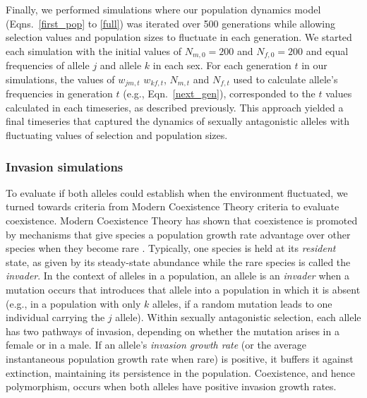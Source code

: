 \documentclass[12pt]{article}
\begin{document}


Finally, we performed simulations where our population dynamics model (Eqns.~\ref{first_pop} to \ref{full}) was iterated over 500 generations while allowing selection values and population sizes to fluctuate in each generation. We started each simulation with the initial values of $N_{m,0}=200$ and $N_{f,0}=200$ and equal frequencies of allele $j$ and allele $k$ in each sex. For each generation $t$ in our simulations, the values of $w_{jm,t}$ $w_{kf,t}$, $N_{m,t}$ and $N_{f,t}$ used to calculate allele's frequencies in generation $t$ (e.g., Eqn.~\ref{next_gen}), corresponded to the $t$ values calculated in each timeseries, as described previously. This approach yielded a final timeseries that captured the dynamics of sexually antagonistic alleles with fluctuating values of selection and population sizes.

\subsubsection*{Invasion simulations}

 To evaluate if both alleles could establish when the environment fluctuated, we turned towards criteria from Modern Coexistence Theory criteria to evaluate coexistence. Modern Coexistence Theory has shown that coexistence is promoted by mechanisms that give species a population growth rate advantage over other species when they become rare \citep{chesson_stabilizing_1982, chesson2003quantifying, barabas_chessons_2018}. Typically, one species is held at its \textit{resident} state, as given by its steady-state abundance while the rare species is called the \textit{invader}. In the context of alleles in a population, an allele is an \textit{invader} when a mutation occurs that introduces that allele into a population in which it is absent (e.g., in a population with only $k$ alleles, if a random mutation leads to one individual carrying the $j$ allele). Within sexually antagonistic selection, each allele has two pathways of invasion, depending on whether the mutation arises in a female or in a male. If an allele's \textit{invasion growth rate} (or the average instantaneous population growth rate when rare) is positive, it buffers it against extinction, maintaining its persistence in the population.  Coexistence, and hence polymorphism, occurs when both alleles have positive invasion growth rates.
\end{document}
